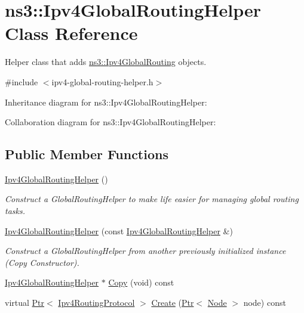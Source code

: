 \hypertarget{classns3_1_1Ipv4GlobalRoutingHelper}{}\section{ns3\+:\+:Ipv4\+Global\+Routing\+Helper Class Reference}
\label{classns3_1_1Ipv4GlobalRoutingHelper}


Helper class that adds \hyperlink{classns3_1_1Ipv4GlobalRouting}{ns3\+::\+Ipv4\+Global\+Routing} objects.  




{\ttfamily \#include $<$ipv4-\/global-\/routing-\/helper.\+h$>$}



Inheritance diagram for ns3\+:\+:Ipv4\+Global\+Routing\+Helper\+:


Collaboration diagram for ns3\+:\+:Ipv4\+Global\+Routing\+Helper\+:
\subsection*{Public Member Functions}
\begin{DoxyCompactItemize}
\item 
\hyperlink{classns3_1_1Ipv4GlobalRoutingHelper_aa164da282f1e29cd35f79eecae897e88}{Ipv4\+Global\+Routing\+Helper} ()
\begin{DoxyCompactList}\small\item\em Construct a Global\+Routing\+Helper to make life easier for managing global routing tasks. \end{DoxyCompactList}\item 
\hyperlink{classns3_1_1Ipv4GlobalRoutingHelper_a89de6dcbec6936fbd1ee6254aedc6521}{Ipv4\+Global\+Routing\+Helper} (const \hyperlink{classns3_1_1Ipv4GlobalRoutingHelper}{Ipv4\+Global\+Routing\+Helper} \&)
\begin{DoxyCompactList}\small\item\em Construct a Global\+Routing\+Helper from another previously initialized instance (Copy Constructor). \end{DoxyCompactList}\item 
\hyperlink{classns3_1_1Ipv4GlobalRoutingHelper}{Ipv4\+Global\+Routing\+Helper} $\ast$ \hyperlink{classns3_1_1Ipv4GlobalRoutingHelper_a6fd74d97461818a65d3d22becb1b6015}{Copy} (void) const 
\item 
virtual \hyperlink{classns3_1_1Ptr}{Ptr}$<$ \hyperlink{classns3_1_1Ipv4RoutingProtocol}{Ipv4\+Routing\+Protocol} $>$ \hyperlink{classns3_1_1Ipv4GlobalRoutingHelper_a7aad4286a1ead7073bd73c6b19a32a59}{Create} (\hyperlink{classns3_1_1Ptr}{Ptr}$<$ \hyperlink{classns3_1_1Node}{Node} $>$ node) const 
\end{DoxyCompactItemize}
